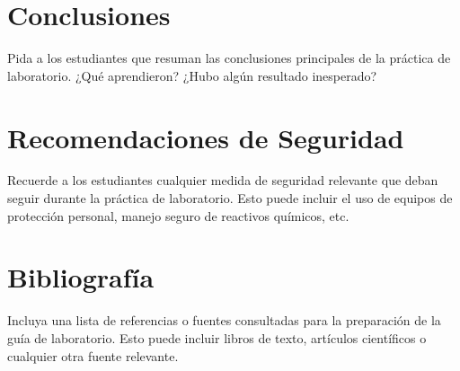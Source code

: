 \documentclass[12pt]{article}
\begin{document}
\section{Conclusiones}
Pida a los estudiantes que resuman las conclusiones principales de la
práctica de laboratorio. ¿Qué aprendieron? ¿Hubo algún resultado
inesperado?

\section{Recomendaciones de Seguridad}
Recuerde a los estudiantes cualquier medida de seguridad relevante que
deban seguir durante la práctica de laboratorio. Esto puede incluir el uso
de equipos de protección personal, manejo seguro de reactivos químicos,
etc.

\section{Bibliografía}
Incluya una lista de referencias o fuentes consultadas para la
preparación de la guía de laboratorio. Esto puede incluir libros de texto,
artículos científicos o cualquier otra fuente relevante.

\nocite{*}
\bibliografia
\end{document}
